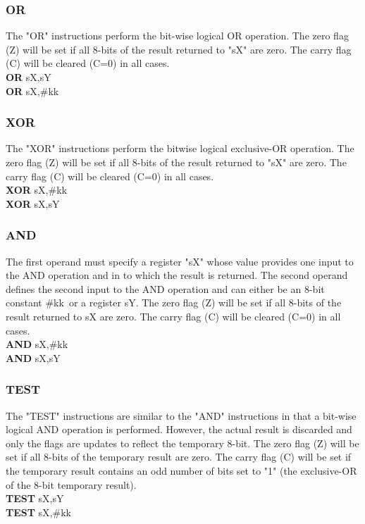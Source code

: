         \subsubsection{OR}
            The "OR" instructions perform the bit-wise logical OR operation.
            The zero flag (Z) will be set if all 8-bits of the result returned to "sX" are zero.
            The carry flag (C) will be cleared (C=0) in all cases.\\
                \textbf{OR} sX,sY\\
                \textbf{OR} sX,\#kk\\

        \subsubsection{XOR}
            The "XOR" instructions perform the bit\-wise logical exclusive-OR operation.
                The zero flag (Z) will be set if all 8-bits of the result returned to "sX" are zero.
            The carry flag (C) will be cleared (C=0) in all cases.\\
                \textbf{XOR} sX,\#kk\\
                \textbf{XOR} sX,sY\\

        \subsubsection{AND}
            The first operand must specify a register "sX" whose value provides one input to the AND operation and in to which the result is returned.
            The second operand defines the second input to the AND operation and can either be an 8-bit constant \#kk\ or a register sY.
            The zero flag (Z) will be set if all 8-bits of the result returned to sX are zero.
            The carry flag (C) will be cleared (C=0) in all cases.\\
                \textbf{AND} sX,\#kk\\
                \textbf{AND} sX,sY\\

        \subsubsection{TEST}
            The "TEST" instructions are similar to the "AND" instructions in that a bit-wise logical AND operation is performed. However, the actual result is discarded and
            only the flags are updates to reflect the temporary 8-bit. The zero flag (Z) will be set if all 8-bits of the temporary result are zero.
            The carry flag (C) will be set if the temporary result contains an odd number of bits set to "1" (the exclusive-OR of the 8-bit temporary result).\\
                \textbf{TEST} sX,sY\\
                \textbf{TEST} sX,\#kk\\
